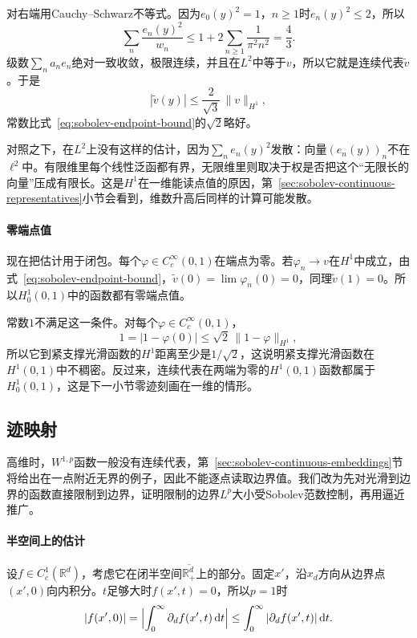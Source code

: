 对右端用Cauchy--Schwarz不等式。因为$e_0(y)^2=1$，$n\geq1$时$e_n(y)^2\leq2$，所以
\[
\sum_n\frac{e_n(y)^2}{w_n}\leq1+2\sum_{n\geq1}\frac1{\pi^2n^2}=\frac43 .
\]
级数$\sum_na_ne_n$绝对一致收敛，极限连续，并且在$L^2$中等于$v$，所以它就是连续代表$\tilde v$。于是
\[
|\tilde v(y)|\leq\frac2{\sqrt3}\,\lVert v\rVert_{H^1},
\]
常数比式~\eqref{eq:sobolev-endpoint-bound}的$\sqrt2$略好。

对照之下，在$L^2$上没有这样的估计，因为$\sum_ne_n(y)^2$发散：向量$(e_n(y))_n$不在$\ell^2$中。有限维里每个线性泛函都有界，无限维里则取决于权是否把这个“无限长的向量”压成有限长。这是$H^1$在一维能读点值的原因，第~\ref{sec:sobolev-continuous-representatives}小节会看到，维数升高后同样的计算可能发散。

\paragraph{零端点值}
现在把估计用于闭包。每个$\varphi\in C_c^\infty(0,1)$在端点为零。若$\varphi_n\to v$在$H^1$中成立，由式~\eqref{eq:sobolev-endpoint-bound}，$\tilde v(0)=\lim\varphi_n(0)=0$，同理$\tilde v(1)=0$。所以$H_0^1(0,1)$中的函数都有零端点值。

常数$1$不满足这一条件。对每个$\varphi\in C_c^\infty(0,1)$，
\[
1=|1-\varphi(0)|\leq\sqrt2\,\lVert1-\varphi\rVert_{H^1},
\]
所以它到紧支撑光滑函数的$H^1$距离至少是$1/\sqrt2$，这说明紧支撑光滑函数在$H^1(0,1)$中不稠密。反过来，连续代表在两端为零的$H^1(0,1)$函数都属于$H_0^1(0,1)$，这是下一小节零迹刻画在一维的情形。

\subsection{迹映射}
\label{sec:sobolev-trace}

高维时，$W^{1,p}$函数一般没有连续代表，第~\ref{sec:sobolev-continuous-embeddings}节将给出在一点附近无界的例子，因此不能逐点读取边界值。我们改为先对光滑到边界的函数直接限制到边界，证明限制的边界$L^p$大小受Sobolev范数控制，再用逼近推广。

\paragraph{半空间上的估计}
设$f\in C_c^1(\mathbb R^d)$，考虑它在闭半空间$\overline{\mathbb R^d_+}$上的部分。固定$x'$，沿$x_d$方向从边界点$(x',0)$向内积分。$t$足够大时$f(x',t)=0$，所以$p=1$时
\[
|f(x',0)|=\Bigl|\int_0^\infty\partial_df(x',t)\,\mathrm dt\Bigr|\leq\int_0^\infty|\partial_df(x',t)|\,\mathrm dt .
\]

